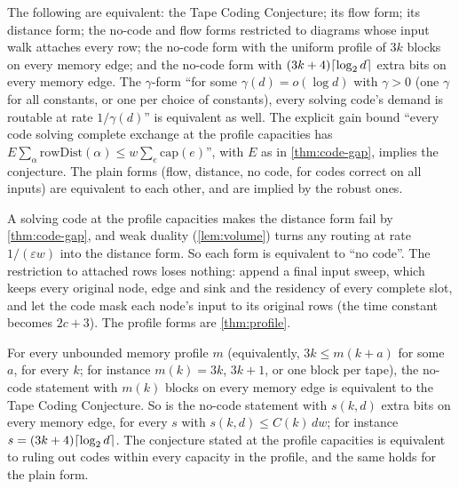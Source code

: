 \begin{theorem}\label{thm:tcc-forms}
The following are equivalent: the Tape Coding Conjecture; its flow form; its distance form; the
no-code and flow forms restricted to diagrams whose input walk attaches every row; the no-code form
with the uniform profile of $3k$ blocks on every memory edge; and the no-code form with
$(3k+4)\lceil \log_2 d \rceil$ extra bits on every memory edge. The $\gamma$-form ``for some $\gamma(d)=o(\log d)$ with
$\gamma>0$ (one $\gamma$ for all constants, or one per choice of constants), every solving code's demand is
routable at rate $1/\gamma(d)$'' is equivalent as well. The explicit gain bound ``every code solving complete
exchange at the profile capacities has $E\sum_\alpha\mathrm{rowDist}(\alpha)\le w\sum_e\mathrm{cap}(e)$'', with $E$ as in
\cref{thm:code-gap}, implies the conjecture. The plain
forms (flow, distance, no code, for codes correct on all inputs) are equivalent to each other, and are
implied by the robust ones.
\end{theorem}

\begin{outline}
A solving code at the profile capacities makes the distance form fail by \cref{thm:code-gap}, and
weak duality (\cref{lem:volume}) turns any routing at rate $1/(\varepsilon w)$ into the distance form.
So each form is equivalent to ``no code''. The restriction to attached rows loses nothing: append a
final input sweep, which keeps every original node, edge and sink and the residency of every complete
slot, and let the code mask each node's input to its original rows (the time constant becomes $2c+3$).
The profile forms are \cref{thm:profile}.
\end{outline}

\begin{theorem}\label{thm:profile}
For every unbounded memory profile $m$ (equivalently, $3k\le m(k+a)$ for some $a$, for every $k$; for
instance $m(k)=3k$, $3k+1$, or one block per tape), the no-code statement with $m(k)$ blocks on every
memory edge is equivalent to the Tape Coding Conjecture. So is the no-code statement with $s(k,d)$
extra bits on every memory edge, for every $s$ with $s(k,d)\le C(k)\,dw$; for instance
$s=(3k+4)\lceil \log_2 d \rceil$. The conjecture stated at the profile capacities is equivalent to ruling out codes
within every capacity in the profile, and the same holds for the plain form.
\end{theorem}

